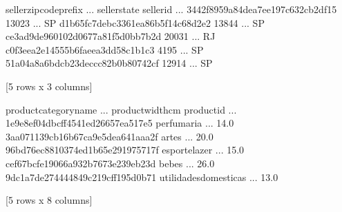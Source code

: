 \documentclass[letterpaper,10pt,english]{jupyterBook}
\begin{document}
\begin{sphinxVerbatim}[commandchars=\\\{\}]
                                  seller\PYGZus{}zip\PYGZus{}code\PYGZus{}prefix  ... seller\PYGZus{}state
seller\PYGZus{}id                                                 ...             
3442f8959a84dea7ee197c632cb2df15                   13023  ...           SP
d1b65fc7debc3361ea86b5f14c68d2e2                   13844  ...           SP
ce3ad9de960102d0677a81f5d0bb7b2d                   20031  ...           RJ
c0f3eea2e14555b6faeea3dd58c1b1c3                    4195  ...           SP
51a04a8a6bdcb23deccc82b0b80742cf                   12914  ...           SP

[5 rows x 3 columns]
\end{sphinxVerbatim}

\begin{sphinxVerbatim}[commandchars=\\\{\}]
  
\end{sphinxVerbatim}

\begin{sphinxVerbatim}[commandchars=\\\{\}]
                                  product\PYGZus{}category\PYGZus{}name  ...  product\PYGZus{}width\PYGZus{}cm
product\PYGZus{}id                                               ...                  
1e9e8ef04dbcff4541ed26657ea517e5             perfumaria  ...              14.0
3aa071139cb16b67ca9e5dea641aaa2f                  artes  ...              20.0
96bd76ec8810374ed1b65e291975717f          esporte\PYGZus{}lazer  ...              15.0
cef67bcfe19066a932b7673e239eb23d                  bebes  ...              26.0
9dc1a7de274444849c219cff195d0b71  utilidades\PYGZus{}domesticas  ...              13.0

[5 rows x 8 columns]
\end{sphinxVerbatim}

\begin{sphinxVerbatim}[commandchars=\\\{\}]
  
\end{sphinxVerbatim}
\end{document}
